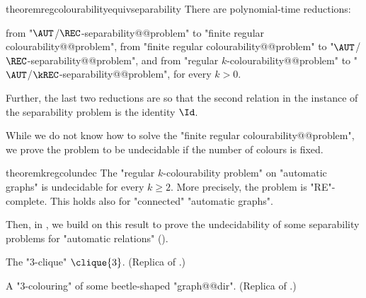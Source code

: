 \begin{restatable*}{theorem}{regcolourabilityequivseparability}
    \AP\label{thm:reg-colourability-equiv-separability}
    There are polynomial-time reductions: 
    \begin{enumerate}
        \itemAP\label{item:reg-colourability-equiv-separability-1} from "$\AUT$/$\REC$-separability@@problem" to "finite regular colourability@@problem", 
        \itemAP\label{item:reg-colourability-equiv-separability-2} from "finite regular colourability@@problem" to "$\AUT$/$\REC$-separability@@problem", and
        \itemAP\label{item:reg-colourability-equiv-separability-3} from "regular $k$-colourability@@problem" to "$\AUT$/$\kREC$-separability@@problem", for every $k > 0$.
    \end{enumerate}
    Further, the last two reductions are so that the second relation in the instance of the separability problem is the identity $\Id$.
\end{restatable*}

While we do not know how to solve the "finite regular colourability@@problem",
we prove the problem to be undecidable if the number of colours is fixed.

\begin{restatable*}{theorem}{kregcolundec}
    \AP\label{thm:k-reg-col-undec}
    The "regular $k$-colourability problem" on "automatic graphs" is undecidable for every $k\geq 2$. More precisely, the problem is "RE"-complete. This holds also for "connected" "automatic graphs".
\end{restatable*}

Then, in , we build on this result to prove the undecidability of
some separability problems for "automatic relations" ().

\begin{marginfigure}[-10em]
	\centering
	\begin{tikzpicture}
		
	\end{tikzpicture}
	\caption{
		\AP\label{fig:dichotomy-3-clique}
		The "$3$-clique" $\clique{3}$.
		(Replica of .)
	}
\end{marginfigure}
\begin{marginfigure}
	\centering
	\begin{tikzpicture}
		
	\end{tikzpicture}
	\caption{
		\AP\label{fig:dichotomy-ex-3-colouring}
		A "$3$-colouring" of some beetle-shaped "graph@@dir".
		(Replica of .)
	}
\end{marginfigure}

